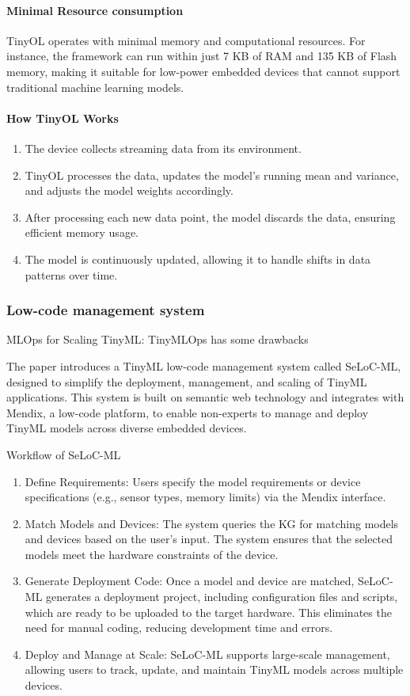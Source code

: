 \documentclass[twocolumn]{article}
\begin{document}
\paragraph{Minimal Resource consumption}TinyOL operates with minimal memory and computational resources. For instance, the framework can run within just 7 KB of RAM and 135 KB of Flash memory, making it suitable for low-power embedded devices that cannot support traditional machine learning models.

\paragraph{How TinyOL Works}

\begin{enumerate}
    \item The device collects streaming data from its environment.
    \item TinyOL processes the data, updates the model’s running mean and variance, and adjusts the model weights accordingly.
    \item After processing each new data point, the model discards the data, ensuring efficient memory usage.
    \item The model is continuously updated, allowing it to handle shifts in data patterns over time.
\end{enumerate}


\subsubsection{Low-code management system}


MLOps for Scaling TinyML: TinyMLOps has some drawbacks

The paper introduces a TinyML low-code management system called SeLoC-ML, designed to simplify the deployment, management, and scaling of TinyML applications. This system is built on semantic web technology and integrates with Mendix, a low-code platform, to enable non-experts to manage and deploy TinyML models across diverse embedded devices.

Workflow of SeLoC-ML

\begin{enumerate}
	\item Define Requirements: Users specify the model requirements or device specifications (e.g., sensor types, memory limits) via the Mendix interface.
	\item	Match Models and Devices: The system queries the KG for matching models and devices based on the user’s input. The system ensures that the selected models meet the hardware constraints of the device.
	\item	Generate Deployment Code: Once a model and device are matched, SeLoC-ML generates a deployment project, including configuration files and scripts, which are ready to be uploaded to the target hardware. This eliminates the need for manual coding, reducing development time and errors.
	\item	Deploy and Manage at Scale: SeLoC-ML supports large-scale management, allowing users to track, update, and maintain TinyML models across multiple devices.
\end{enumerate}
\end{document}
